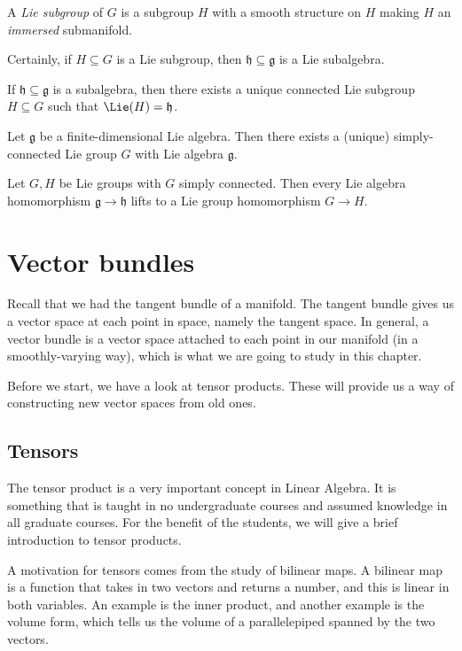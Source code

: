 \documentclass[a4paper]{article}
\begin{document}
\begin{defi}
  A \emph{Lie subgroup} of $G$ is a subgroup $H$ with a smooth structure on $H$ making $H$ an \emph{immersed} submanifold.
\end{defi}

Certainly, if $H \subseteq G$ is a Lie subgroup, then $\mathfrak{h} \subseteq \mathfrak{g}$ is a Lie subalgebra.

\begin{thm}
  If $\mathfrak{h} \subseteq \mathfrak{g}$ is a subalgebra, then there exists a unique connected Lie subgroup $H \subseteq G$ such that $\Lie(H) = \mathfrak{h}$.
\end{thm}

\begin{thm}
  Let $\mathfrak{g}$ be a finite-dimensional Lie algebra. Then there exists a (unique) simply-connected Lie group $G$ with Lie algebra $\mathfrak{g}$.
\end{thm}

\begin{thm}
  Let $G, H$ be Lie groups with $G$ simply connected. Then every Lie algebra homomorphism $\mathfrak{g} \to \mathfrak{h}$ lifts to a Lie group homomorphism $G \to H$.
\end{thm}

\section{Vector bundles}
Recall that we had the tangent bundle of a manifold. The tangent bundle gives us a vector space at each point in space, namely the tangent space. In general, a vector bundle is a vector space attached to each point in our manifold (in a smoothly-varying way), which is what we are going to study in this chapter.

Before we start, we have a look at tensor products. These will provide us a way of constructing new vector spaces from old ones.

\subsection{Tensors} %
The tensor product is a very important concept in Linear Algebra. It is something that is taught in no undergraduate courses and assumed knowledge in all graduate courses. For the benefit of the students, we will give a brief introduction to tensor products.

A motivation for tensors comes from the study of bilinear maps. A bilinear map is a function that takes in two vectors and returns a number, and this is linear in both variables. An example is the inner product, and another example is the volume form, which tells us the volume of a parallelepiped spanned by the two vectors.
\end{document}

